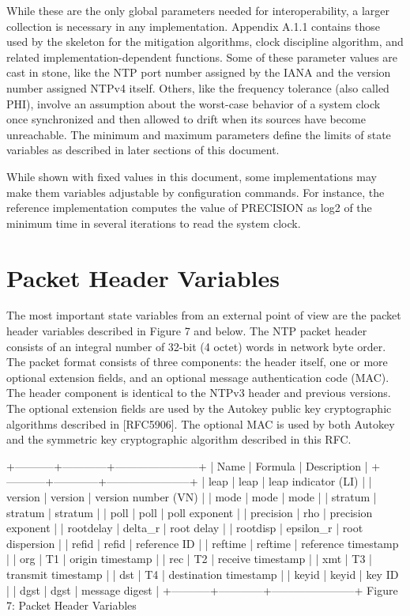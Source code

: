 While these are the only global parameters needed for
interoperability, a larger collection is necessary in any
implementation. Appendix A.1.1 contains those used by the skeleton
for the mitigation algorithms, clock discipline algorithm, and
related implementation-dependent functions. Some of these parameter
values are cast in stone, like the NTP port number assigned by the
IANA and the version number assigned NTPv4 itself. Others, like the
frequency tolerance (also called PHI), involve an assumption about
the worst-case behavior of a system clock once synchronized and then
allowed to drift when its sources have become unreachable. The
minimum and maximum parameters define the limits of state variables
as described in later sections of this document.

While shown with fixed values in this document, some implementations
may make them variables adjustable by configuration commands. For
instance, the reference implementation computes the value of
PRECISION as log2 of the minimum time in several iterations to read
the system clock.

\section{Packet Header Variables}

The most important state variables from an external point of view are
the packet header variables described in Figure 7 and below. The NTP
packet header consists of an integral number of 32-bit (4 octet)
words in network byte order. The packet format consists of three
components: the header itself, one or more optional extension fields,
and an optional message authentication code (MAC). The header
component is identical to the NTPv3 header and previous versions.
The optional extension fields are used by the Autokey public key
cryptographic algorithms described in [RFC5906]. The optional MAC is
used by both Autokey and the symmetric key cryptographic algorithm
described in this RFC.

+-----------+------------+-----------------------+
| Name | Formula | Description |
+-----------+------------+-----------------------+
| leap | leap | leap indicator (LI) |
| version | version | version number (VN) |
| mode | mode | mode |
| stratum | stratum | stratum |
| poll | poll | poll exponent |
| precision | rho | precision exponent |
| rootdelay | delta\_r | root delay |
| rootdisp | epsilon\_r | root dispersion |
| refid | refid | reference ID |
| reftime | reftime | reference timestamp |
| org | T1 | origin timestamp |
| rec | T2 | receive timestamp |
| xmt | T3 | transmit timestamp |
| dst | T4 | destination timestamp |
| keyid | keyid | key ID |
| dgst | dgst | message digest |
+-----------+------------+-----------------------+
Figure 7: Packet Header Variables

